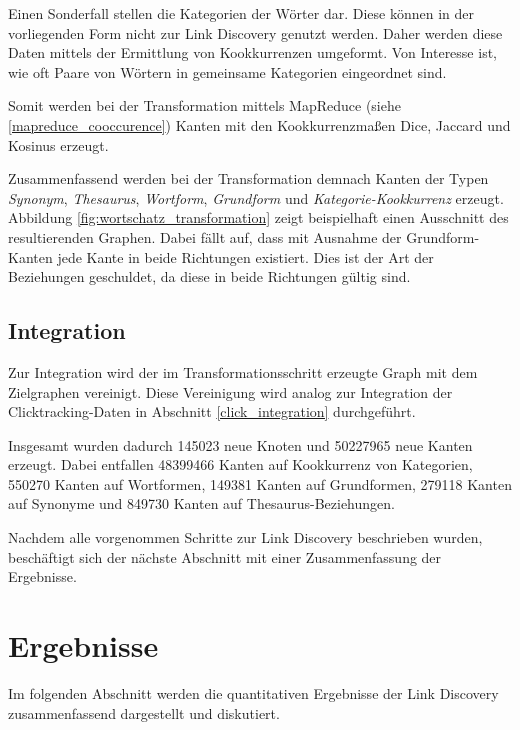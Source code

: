 Einen Sonderfall stellen die Kategorien der Wörter dar. Diese können in der vorliegenden Form nicht zur Link Discovery genutzt werden. Daher werden diese Daten mittels der Ermittlung von Kookkurrenzen umgeformt. Von Interesse ist, wie oft Paare von Wörtern 
in gemeinsame Kategorien eingeordnet sind. 

Somit werden bei der Transformation mittels MapReduce (siehe \ref{mapreduce_cooccurence}) Kanten mit den Kookkurrenzmaßen Dice, Jaccard und Kosinus erzeugt.

Zusammenfassend werden bei der Transformation demnach Kanten der Typen \emph{Synonym}, \emph{Thesaurus}, \emph{Wortform}, \emph{Grundform} und \emph{Kategorie-Kookkurrenz} erzeugt. Abbildung \ref{fig:wortschatz_transformation} zeigt beispielhaft einen Ausschnitt des resultierenden Graphen. Dabei fällt auf, dass mit Ausnahme der Grundform-Kanten jede Kante in beide Richtungen existiert. Dies ist der Art der Beziehungen geschuldet, da diese in beide Richtungen gültig sind.

\subsection{Integration}

Zur Integration wird der im Transformationsschritt erzeugte Graph mit dem Zielgraphen vereinigt. Diese Vereinigung wird analog zur Integration der Clicktracking-Daten in Abschnitt \ref{click_integration} durchgeführt.

Insgesamt wurden dadurch \num{145023} neue Knoten und \num{50227965} neue Kanten erzeugt.  Dabei entfallen \num{48399466} Kanten auf Kookkurrenz von Kategorien, \num{550270} Kanten auf Wortformen, \num{149381} Kanten auf Grundformen, \num{279118} Kanten auf Synonyme und \num{849730} Kanten auf Thesaurus-Beziehungen.

Nachdem alle vorgenommen Schritte zur Link Discovery beschrieben wurden, beschäftigt sich der nächste Abschnitt mit einer Zusammenfassung der Ergebnisse.

\section{Ergebnisse}

Im folgenden Abschnitt werden die quantitativen Ergebnisse der Link Discovery zusammenfassend dargestellt und diskutiert.

